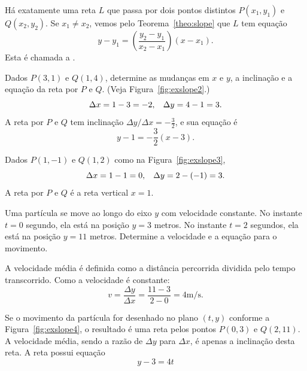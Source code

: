 
Há exatamente uma reta $L$ que passa por dois pontos distintos
$P(x_1,y_1)$ e $Q(x_2, y_2)$. Se $x_1 \ne x_2$, vemos pelo
Teorema~\ref{theo:slope} que $L$ tem equação
\[
  y - y_1 = \left( \frac{y_2 - y_1}{x_2 - x_1} \right) (x - x_1).
\]
Esta é chamada a .

\begin{example}
Dados $P(3,1)$ e $Q(1,4)$, determine as mudanças em $x$ e $y$,
a inclinação e a equação da reta por $P$ e $Q$. (Veja
Figura~\ref{fig:exslope2}.)
\[
  \Delta x = 1 - 3 = -2, \hspace{2ex} \Delta y = 4 - 1 = 3.
\]
A reta por $P$ e $Q$ tem inclinação $\Delta y / \Delta x = -\frac{3}{2}$,
e sua equação é
\[
  y - 1 = -\frac{3}{2}(x-3).
\]
\end{example}


\begin{example}
Dados $P(1,-1)$ e $Q(1,2)$ como na Figura~\ref{fig:exslope3},
\[
  \Delta x = 1 - 1 = 0, \hspace{2ex} \Delta y = 2 - (-1) = 3.
\]
A reta por $P$ e $Q$ é a reta vertical $x = 1$.
\end{example}


\begin{example}
Uma partícula se move ao longo do eixo $y$ com velocidade
constante. No instante $t=0$ segundo, ela está na posição
$y = 3$ metros. No instante $t = 2$ segundos, ela está na
posição $y = 11$ metros. Determine a velocidade e a
equação para o movimento.

A velocidade média é definida como a distância percorrida dividida
pelo tempo transcorrido. Como a velocidade é constante:
\[
  v = \frac{\Delta y}{\Delta x} = \frac{11-3}{2-0} = 4 \text{m/s}.
\]

Se o movimento da partícula for desenhado no plano $(t,y)$
conforme a Figura~\ref{fig:exslope4}, o resultado é uma reta
pelos pontos $P(0,3)$ e $Q(2,11)$. A velocidade média,
sendo a razão de $\Delta y$ para $\Delta x$, é apenas a
inclinação desta reta. A reta possui equação
\[
  y - 3 = 4t
\]
\end{example}


